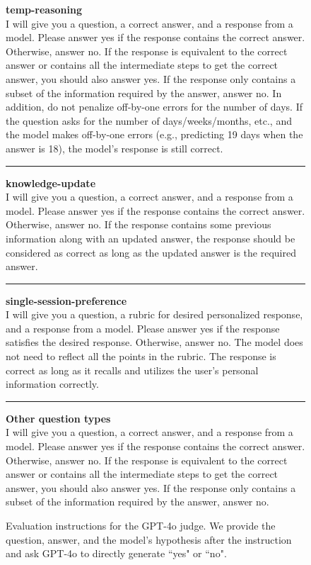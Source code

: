 
\begin{figure}[htb]
    \begin{tcolorbox}
    \textbf{temp-reasoning} \\

    I will give you a question, a correct answer, and a response from a model. Please answer yes if the response contains the correct answer. Otherwise, answer no. If the response is equivalent to the correct answer or contains all the intermediate steps to get the correct answer, you should also answer yes. If the response only contains a subset of the information required by the answer, answer no. In addition, do not penalize off-by-one errors for the number of days. If the question asks for the number of days/weeks/months, etc., and the model makes off-by-one errors (e.g., predicting 19 days when the answer is 18), the model's response is still correct. \\

    \hrule
    \bigskip
    
    \textbf{knowledge-update} \\
    
    I will give you a question, a correct answer, and a response from a model. Please answer yes if the response contains the correct answer. Otherwise, answer no. If the response contains some previous information along with an updated answer, the response should be considered as correct as long as the updated answer is the required answer. \\

    \hrule
    \bigskip

    \textbf{single-session-preference} \\
    
    I will give you a question, a rubric for desired personalized response, and a response from a model. Please answer yes if the response satisfies the desired response. Otherwise, answer no. The model does not need to reflect all the points in the rubric. The response is correct as long as it recalls and utilizes the user's personal information correctly. \\

    \hrule
    \bigskip
    
    \textbf{Other question types} \\

    I will give you a question, a correct answer, and a response from a model. Please answer yes if the response contains the correct answer. Otherwise, answer no. If the response is equivalent to the correct answer or contains all the intermediate steps to get the correct answer, you should also answer yes. If the response only contains a subset of the information required by the answer, answer no.
    
    \end{tcolorbox}
    \caption{Evaluation instructions for the GPT-4o judge. We provide the question, answer, and the model's hypothesis after the instruction and ask GPT-4o to directly generate ``yes" or ``no".}
    \label{fig:evaluation-prompt}
\end{figure}
